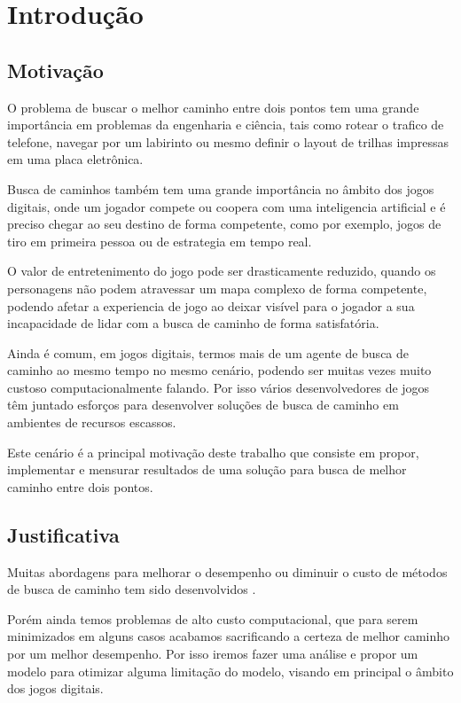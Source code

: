 
\chapter[Introdução]{Introdução}

\section{Motivação}

O problema de buscar o melhor caminho entre dois pontos tem uma grande importância em problemas da engenharia e ciência, tais como rotear o trafico de telefone, navegar por um labirinto ou mesmo definir o layout de trilhas impressas em uma placa eletrônica.

Busca de caminhos também tem uma grande importância no âmbito dos jogos digitais, onde um jogador compete ou coopera com uma inteligencia artificial e é preciso chegar ao seu destino de forma competente, como por exemplo, jogos de tiro em primeira pessoa ou de estrategia em tempo real.

O valor de entretenimento do jogo pode ser drasticamente reduzido, quando os personagens não podem atravessar um mapa complexo de forma competente, podendo afetar a experiencia de jogo ao deixar visível para o jogador a sua incapacidade de lidar com a busca de caminho de forma satisfatória.

Ainda é comum, em jogos digitais, termos mais de um agente de busca de caminho ao mesmo tempo no mesmo cenário, podendo ser muitas vezes muito custoso computacionalmente falando. Por isso vários desenvolvedores de jogos têm juntado esforços para desenvolver soluções de busca de caminho em ambientes de recursos escassos. \cite{Pontevia}

Este cenário é a principal motivação deste trabalho que consiste em propor, implementar e mensurar resultados de uma solução para busca de melhor caminho entre dois pontos.

\section{Justificativa}

Muitas abordagens para melhorar o desempenho ou diminuir o custo de métodos de busca de caminho tem sido desenvolvidos \cite{Ulysses}  \cite{Pollack} \cite{Timothy} \cite{WilliamMiller}. 

Porém ainda temos problemas de alto custo computacional, que para serem minimizados em alguns casos acabamos sacrificando a certeza de melhor caminho por um melhor desempenho\cite{Botea}. Por isso iremos fazer uma análise e propor um modelo para otimizar alguma limitação do modelo, visando em principal o âmbito dos jogos digitais.

